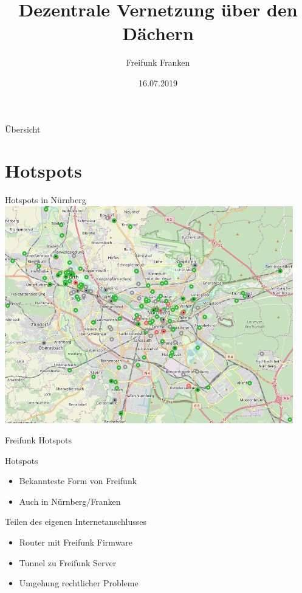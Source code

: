 \documentclass{beamer}
\title{Dezentrale Vernetzung über den Dächern}
\date{16.07.2019}
\author{Freifunk Franken}
\begin{document}
	\maketitle
	\begin{frame}{Übersicht}
		\tableofcontents
	\end{frame}

	\section{Hotspots}
	\begin{frame}[plain]{Hotspots in Nürnberg}
		\centering
		\includegraphics[width=0.94\textwidth]{media/hotspots.png}
	\end{frame}
	\begin{frame}{Freifunk Hotspots}
		\begin{block}{Hotspots}
			\begin{itemize}
				\item Bekannteste Form von Freifunk
				\item Auch in Nürnberg/Franken
			\end{itemize}
		\end{block}
		\vspace{1em}
		\pause
		\begin{block}{Teilen des eigenen Internetanschlusses}
			\begin{itemize}
				\item Router mit Freifunk Firmware
				\item Tunnel zu Freifunk Server
				\item Umgehung rechtlicher Probleme
			\end{itemize}
		\end{block}
	\end{frame}
\end{document}
